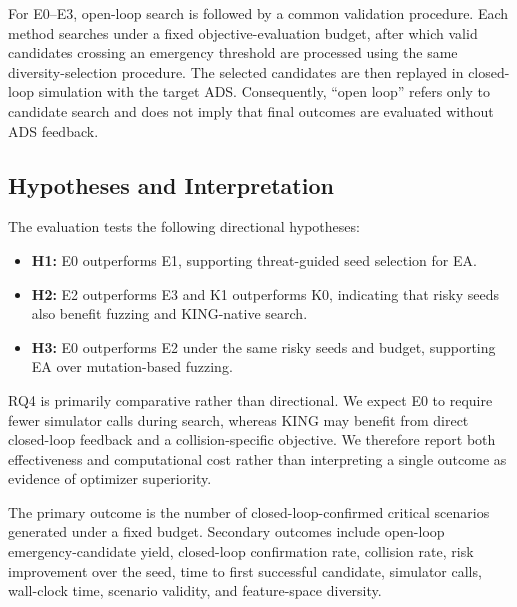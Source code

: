 For E0--E3, open-loop search is followed by a common validation procedure. Each method searches under a fixed objective-evaluation budget, after which valid candidates crossing an emergency threshold are processed using the same diversity-selection procedure. The selected candidates are then replayed in closed-loop simulation with the target ADS. Consequently, ``open loop'' refers only to candidate search and does not imply that final outcomes are evaluated without ADS feedback.

\subsection{Hypotheses and Interpretation}
\label{sec:hypotheses}

The evaluation tests the following directional hypotheses:

\begin{itemize}
    \item \textbf{H1:} E0 outperforms E1, supporting threat-guided seed selection for EA.
    \item \textbf{H2:} E2 outperforms E3 and K1 outperforms K0, indicating that risky seeds also benefit fuzzing and KING-native search.
    \item \textbf{H3:} E0 outperforms E2 under the same risky seeds and budget, supporting EA over mutation-based fuzzing.
\end{itemize}

RQ4 is primarily comparative rather than directional. We expect E0 to require fewer simulator calls during search, whereas KING may benefit from direct closed-loop feedback and a collision-specific objective. We therefore report both effectiveness and computational cost rather than interpreting a single outcome as evidence of optimizer superiority.

The primary outcome is the number of closed-loop-confirmed critical scenarios generated under a fixed budget. Secondary outcomes include open-loop emergency-candidate yield, closed-loop confirmation rate, collision rate, risk improvement over the seed, time to first successful candidate, simulator calls, wall-clock time, scenario validity, and feature-space diversity.
